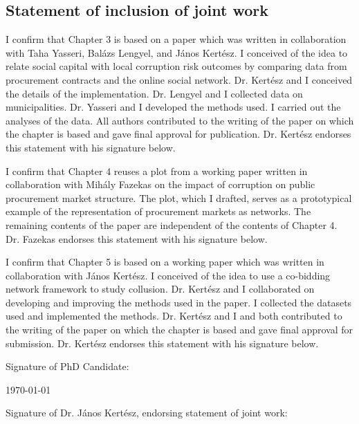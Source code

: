 \documentclass[a4paper,twoside,12pt]{book}
\begin{document}
\subsection*{Statement of inclusion of joint work}
I confirm that Chapter 3 is based on a paper which was written in collaboration with Taha Yasseri, Bal\'azs Lengyel, and J\'anos Kert\'esz. I conceived of the idea to relate social capital with local corruption risk outcomes by comparing data from procurement contracts and the online social network. Dr. Kert\'esz and I conceived the details of the implementation. Dr. Lengyel and I collected data on municipalities. Dr. Yasseri and I developed the methods used. I carried out the analyses of the data. All authors contributed to the writing of the paper on which the chapter is based and gave final approval for publication. Dr. Kert\'esz endorses this statement with his signature below.

\vspace{.2cm}

I confirm that Chapter 4 reuses a plot from a working paper written in collaboration with Mih\'aly Fazekas on the impact of corruption on public procurement market structure. The plot, which I drafted, serves as a prototypical example of the representation of procurement markets as networks. The remaining contents of the paper are independent of the contents of Chapter 4. Dr. Fazekas endorses this statement with his signature below.


\vspace{.2cm}

\noindent
I confirm that Chapter 5 is based on a working paper which was written in collaboration with J\'anos Kert\'esz. I conceived of the idea to use a co-bidding network framework to study collusion. Dr. Kert\'esz and I collaborated on developing and improving the methods used in the paper. I collected the datasets used and implemented the methods. Dr. Kert\'esz and I and both contributed to the writing of the paper on which the chapter is based and gave final approval for submission. Dr. Kert\'esz endorses this statement with his signature below.



\vspace{0.5cm}
\noindent
Signature of PhD Candidate:

\vspace{2cm}
\noindent
\monthyeardate\today


\vspace{3.5cm}
\noindent
Signature of Dr. J\'anos Kert\'esz, endorsing statement of joint work:
\end{document}
